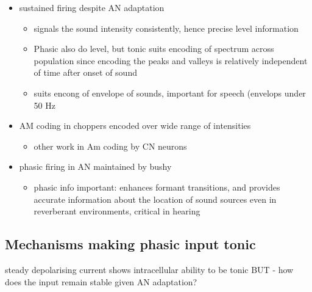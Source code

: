 \begin{itemize}
\item sustained firing despite AN adaptation
\begin{itemize}
\item signals the sound intensity consistently, hence precise level information
\item Phasic also do level, but tonic suits encoding of spectrum across population since encoding the peaks and valleys is relatively independent of time after onset of sound \citep{BlackburnSachs:1990,May:2003,MayPrellEtAl:1998,MaySachs:1998}
\item suits encong of envelope of sounds, important for speech (envelops under 50 Hz \citep{ShannonZengEtAl:1995}
\end{itemize}
\item AM coding in choppers encoded over wide range of intensities \citep{RhodeGreenberg:1994,FrisinaSmithEtAl:1990}
\begin{itemize}
\item other work in Am coding by CN neurons  \citep{Moller:1972,Moller:1974a,Moller:1974,MooreCashin:1974,Frisina:1984,PalmerWinterEtAl:1986,KimRhodeEtAl:1986,WinterPalmer:1990a,Palmer:1990,PalmerWinter:1992,FrisinaSmithEtAl:1990a,Frisina:1983,GorodetskaiaBibikov:1985,RhodeGreenberg:1994,ShofnerSheftEtAl:1996,FrisinaKarcichEtAl:1996,DAngeloSterbingEtAl:2003,Aggarwal:2003}
\end{itemize}
\item phasic firing in AN maintained by bushy
\begin{itemize}
\item phasic info important: enhances formant transitions, and provides accurate information about the location of sound sources even in reverberant environments, critical in hearing \cite{DelgutteKiang:1984,DelgutteKiang:1984a,DelgutteKiang:1984b,DelgutteKiang:1984c,DelgutteKiang:1984d,DavoreIhlefeldEtAl:2009}
\end{itemize}
\end{itemize}
\subsection{Mechanisms making phasic input tonic}
\label{sec-1_3}


   steady depolarising current shows intracellular ability to be tonic \cite{Oertel:1983,OertelWuEtAl:1988} BUT - how does the input remain stable given AN adaptation?


